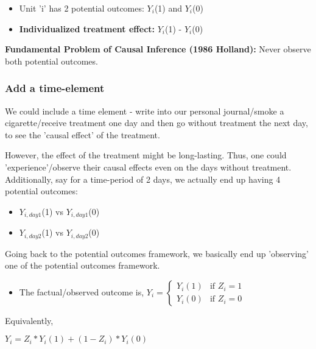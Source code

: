 \documentclass[11pt]{elegantbook}
\begin{document}
\begin{itemize}
    \item Unit 'i' has 2 potential outcomes: $Y_i$(1) and $Y_i$(0)
\end{itemize}

\begin{itemize}
    \item \textbf{Individualized treatment effect:} $Y_i$(1) - $Y_i$(0)
\end{itemize}

\textbf{Fundamental Problem of Causal Inference (1986 Holland):}
Never observe both potential outcomes.

\subsubsection{Add a time-element}
We could include a time element - write into our personal journal/smoke a cigarette/receive treatment one day and then go without treatment the next day, to see the 'causal effect' of the treatment.

However, the effect of the treatment might be long-lasting. Thus, one could 'experience'/observe their causal effects even on the days without treatment. Additionally, say for a time-period of 2 days, we actually end up having 4 potential outcomes:

\begin{itemize}
    \item $Y_{i, day 1}$(1) vs $Y_{i, day 1}$(0)
\end{itemize}

\begin{itemize}
    \item $Y_{i, day 2}$(1) vs $Y_{i, day 2}$(0)
\end{itemize}


Going back to the potential outcomes framework, we basically end up 'observing' one of the potential outcomes framework.

\begin{itemize}
    \item The factual/observed outcome is, $Y_i = 
\begin{cases}
Y_i(1) & \text{if } Z_i = 1 \\
Y_i(0) & \text{if } Z_i = 0
\end{cases}
$ 
\end{itemize}

Equivalently, 

$Y_i = Z_i*Y_i(1) + (1-Z_i)*Y_i(0)$
\end{document}

